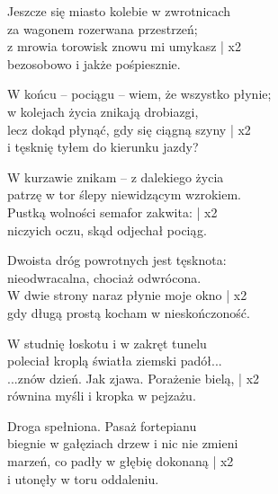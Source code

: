 \begin{text}
    \hfill\break
    Jeszcze się miasto kolebie w zwrotnicach\\
    za wagonem rozerwana przestrzeń;\\
    z mrowia torowisk znowu mi umykasz | x2\\
    bezosobowo i jakże pośpiesznie.

    W końcu – pociągu – wiem, że wszystko płynie;\\
    w kolejach życia znikają drobiazgi,\\
    lecz dokąd płynąć, gdy się ciągną szyny | x2\\
    i tęsknię tyłem do kierunku jazdy?

    W kurzawie znikam – z dalekiego życia\\
    patrzę w tor ślepy niewidzącym wzrokiem.\\
    Pustką wolności semafor zakwita: | x2\\
    niczyich oczu, skąd odjechał pociąg.

    Dwoista dróg powrotnych jest tęsknota:\\
    nieodwracalna, chociaż odwrócona.\\
    W dwie strony naraz płynie moje okno | x2\\
    gdy długą prostą kocham w nieskończoność.

    \hfill\break
    W studnię łoskotu i w zakręt tunelu\\
    poleciał kroplą światła ziemski padół...\\
    ...znów dzień. Jak zjawa. Porażenie bielą, | x2\\
    równina myśli i kropka w pejzażu.

    Droga spełniona. Pasaż fortepianu\\
    biegnie w gałęziach drzew i nic nie zmieni\\
    marzeń, co padły w głębię dokonaną | x2\\
    i utonęły w toru oddaleniu.
\end{text}
